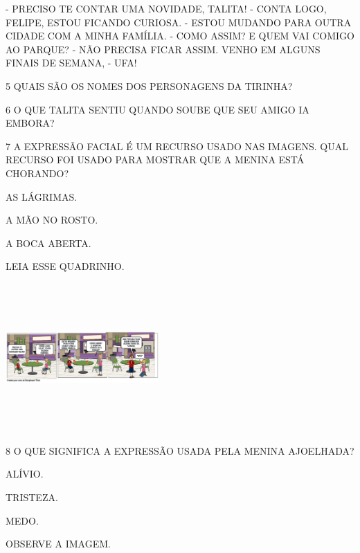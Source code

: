 
- PRECISO TE CONTAR UMA NOVIDADE, TALITA!
- CONTA LOGO, FELIPE, ESTOU FICANDO CURIOSA.
- ESTOU MUDANDO PARA OUTRA CIDADE COM A MINHA FAMÍLIA.
- COMO ASSIM? E QUEM VAI COMIGO AO PARQUE?
- NÃO PRECISA FICAR ASSIM. VENHO EM ALGUNS FINAIS DE SEMANA,
- UFA!

\num{5} QUAIS SÃO OS NOMES DOS PERSONAGENS DA TIRINHA?


\num{6} O QUE TALITA SENTIU QUANDO SOUBE QUE SEU AMIGO IA EMBORA?


\num{7} A EXPRESSÃO FACIAL É UM RECURSO USADO NAS IMAGENS. QUAL RECURSO FOI USADO PARA MOSTRAR QUE A MENINA ESTÁ CHORANDO?

\begin{boxlist}
\boxitem[\rosa{X}] AS LÁGRIMAS.

\boxitem[] A MÃO NO ROSTO.

\boxitem[] A BOCA ABERTA.
\end{boxlist}

LEIA ESSE QUADRINHO.

\includegraphics[width=2.31319in,height=2.23333in]{media/image175.png}

\num{8} O QUE SIGNIFICA A EXPRESSÃO USADA PELA MENINA AJOELHADA?

\begin{boxlist}
\boxitem[X] ALÍVIO.

\boxitem[] TRISTEZA.

\boxitem[] MEDO.
\end{boxlist}

OBSERVE A IMAGEM.


